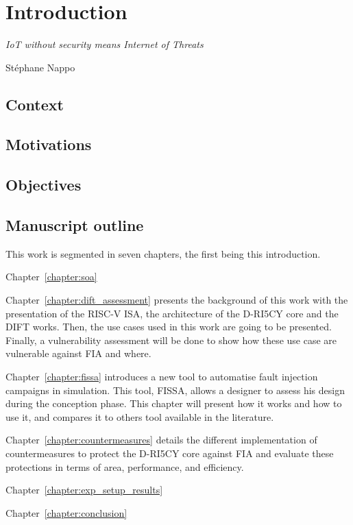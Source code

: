 \chapter{Introduction}
\label{chapter:introduction}

\epigraph{\textit{IoT without security means Internet of Threats}}{Stéphane Nappo}

\minitoc

\section{Context}


\section{Motivations}

\section{Objectives}

\section{Manuscript outline}

This work is segmented in seven chapters, the first being this introduction.

Chapter~\ref{chapter:soa}

Chapter~\ref{chapter:dift_assessment} presents the background of this work with the presentation of the RISC-V ISA, the architecture of the D-RI5CY core and the DIFT works. Then, the use cases used in this work are going to be presented. Finally, a vulnerability assessment will be done to show how these use case are vulnerable against FIA and where.

Chapter~\ref{chapter:fissa} introduces a new tool to automatise fault injection campaigns in simulation. This tool, FISSA, allows a designer to assess his design during the conception phase. This chapter will present how it works and how to use it, and compares it to others tool available in the literature.

Chapter~\ref{chapter:countermeasures} details the different implementation of countermeasures to protect the D-RI5CY core against FIA and evaluate these protections in terms of area, performance, and efficiency.

Chapter~\ref{chapter:exp_setup_results}

Chapter~\ref{chapter:conclusion}

